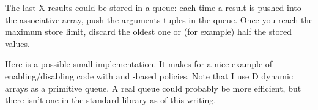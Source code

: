 The last X results could be stored in a queue: each time a result is pushed into the associative array, push the arguments tuples in the queue. Once you reach the maximum store limit, discard the oldest one or (for example) half the stored values.

Here is a possible small implementation. It makes for a nice example of enabling/disabling code with  and -based policies. Note that I use D dynamic arrays as a primitive queue. A real queue could probably be more efficient, but there isn't one in the standard library as of this writing.

